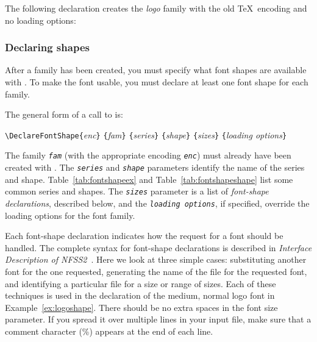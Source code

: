 The following declaration creates the \textit{logo} family with the old \TeX\
encoding and no loading options:

\begin{shortexample}
\end{shortexample}

\subsubsection{Declaring shapes}

After a family has been created, you must specify what font 
shapes are
available with .  To make the font usable, you must
declare at least one font shape for each family.

The general form of a call to  is: 

\begin{ttindent}
\verb|\DeclareFontShape{|\textit{enc}\verb|}|%
   \verb|{|\textit{fam}\verb|}|%
   \verb|{|\textit{series}\verb|}|%
   \verb|{|\textit{shape}\verb|}|%
   \verb|{|\textit{sizes}\verb|}|%
   \verb|{|\textit{loading options}\verb|}|
\end{ttindent}

The family \texttt{\textit{fam}} (with the appropriate encoding \texttt{\textit{enc}})
must already have been created with \cs{DeclareFontFamily}.  The
\texttt{\textit{series}} and \texttt{\textit{shape}} parameters identify the
name of the series and shape.  Table~\ref{tab:fontshapeex} and
Table~\ref{tab:fontshapeshape} list some common series and shapes.  The
\textit{\tt sizes} parameter is a list of \textit{font-shape declarations},
described below, and the \textit{\tt loading options}, if specified, override
the loading options for the font family.

Each font-shape declaration indicates how the request for a font should be
handled.  The complete syntax for font-shape declarations is described in
\textit{Interface Description of NFSS2}~\cite{nfss2interface}.  Here we look
at three simple cases: substituting another font for the one requested,
generating the name of the  file for the requested font, and
identifying a particular \ext{TFM} file for a size or range of sizes.  Each of
these techniques is used in the declaration of the medium, normal logo font in
Example~\ref{ex:logoshape}.  There should be no extra spaces in the font size
parameter.  If you spread it over multiple lines in your input file, make sure
that a comment character (\%) appears at the end of each line.

